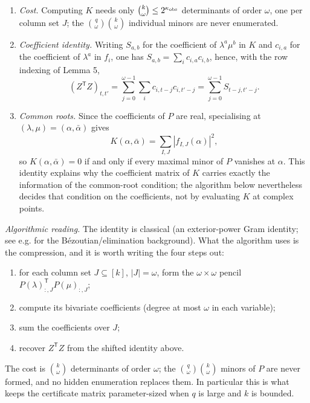 \documentclass[journal]{IEEEtran}
\theoremstyle{plainn}
\begin{document}
\begin{enumerate}
\item \emph{Cost.} Computing $K$ needs only $\binom{k}{\omega}\le2^{\kappa_{\rm obs}}$ determinants of order $\omega$, one per column set $J$; the $\binom q\omega\binom k\omega$ individual minors are never enumerated.
\item \emph{Coefficient identity.} Writing $S_{a,b}$ for the coefficient of $\lambda^a\mu^b$ in $K$ and $c_{i,a}$ for the coefficient of $\lambda^a$ in $f_i$, one has $S_{a,b}=\sum_ic_{i,a}c_{i,b}$, hence, with the row indexing of Lemma 5, \[
(Z^{\mathsf T}Z)_{t,t'}
   =\sum_{j=0}^{\omega-1}\sum_ic_{i,t-j}c_{i,t'-j}
   =\sum_{j=0}^{\omega-1}S_{t-j,t'-j}.
\]
\item \emph{Common roots.} Since the coefficients of $P$ are real, specialising at
$(\lambda,\mu)=(\alpha,\bar\alpha)$ gives
\begin{equation}
K(\alpha,\bar\alpha)=\sum_{I,J}\left|f_{I,J}(\alpha)\right|^2,
\end{equation}
so $K(\alpha,\bar\alpha)=0$ if and only if every maximal minor of $P$ vanishes at
$\alpha$. This identity explains why the coefficient matrix of $K$ carries exactly the
information of the common-root condition; the algorithm below nevertheless decides that
condition on the coefficients, not by evaluating $K$ at complex points.
\end{enumerate}
\emph{Algorithmic reading.} The identity is classical (an exterior-power Gram identity; see e.g. \cite{emi99} for the B\'ezoutian/elimination background). What the algorithm uses is the compression, and it is worth writing the four steps out:

\begin{enumerate}
\item for each column set $J\subseteq[k]$, $|J|=\omega$, form the $\omega\times\omega$ pencil $P(\lambda)_{:,J}^{\mathsf T}P(\mu)_{:,J}$;
\item compute its bivariate coefficients (degree at most $\omega$ in each variable);
\item sum the coefficients over $J$;
\item recover $Z^{\mathsf T}Z$ from the shifted identity above.
\end{enumerate}
The cost is $\binom{k}{\omega}$ determinants of order $\omega$; the $\binom q\omega\binom k\omega$ minors of $P$ are never formed, and no hidden enumeration replaces them. In particular this is what keeps the certificate matrix parameter-sized when $q$ is large and $k$ is bounded.
\end{document}
